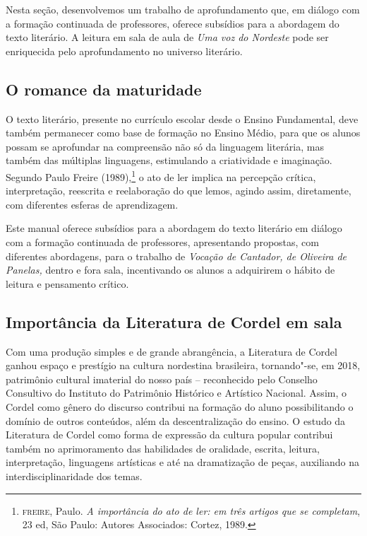\documentclass[12pt]{extarticle}
\begin{document}
Nesta seção, desenvolvemos um trabalho de aprofundamento que, em diálogo
com a formação continuada de professores, oferece subsídios para a
abordagem do texto literário. A leitura em sala de aula de
\emph{Uma voz do Nordeste} pode ser enriquecida pelo aprofundamento no
universo literário.

\subsection{O romance da maturidade}

O texto literário, presente no currículo escolar desde o Ensino
Fundamental, deve também permanecer como base de formação no Ensino
Médio, para que os alunos possam se aprofundar na compreensão não só da
linguagem literária, mas também das múltiplas linguagens, estimulando a
criatividade e imaginação. Segundo Paulo Freire (1989),\footnote{\textsc{freire}, Paulo. \textit{A importância do ato de ler: em três artigos que se completam}, 23 ed, São Paulo: Autores Associados: Cortez, 1989.} o ato de
ler implica na percepção crítica, interpretação, reescrita e
reelaboração do que lemos, agindo assim, diretamente, com diferentes
esferas de aprendizagem.

Este manual oferece subsídios para a abordagem do texto literário em
diálogo com a formação continuada de professores, apresentando
propostas, com diferentes abordagens, para o trabalho de \emph{Vocação
de Cantador, de Oliveira de Panelas,} dentro e fora sala, incentivando
os alunos a adquirirem o hábito de leitura e pensamento crítico.

\subsection{Importância da Literatura de Cordel em sala}

Com uma produção simples e de grande abrangência, a Literatura de Cordel
ganhou espaço e prestígio na cultura nordestina brasileira, tornando"-se,
em 2018, patrimônio cultural imaterial do nosso país -- reconhecido pelo
Conselho Consultivo do Instituto do Patrimônio Histórico e Artístico
Nacional. Assim, o Cordel como gênero do discurso contribui na formação
do aluno possibilitando o domínio de outros conteúdos, além da
descentralização do ensino. O estudo da Literatura de Cordel como forma
de expressão da cultura popular contribui também no aprimoramento das
habilidades de oralidade, escrita, leitura, interpretação, linguagens
artísticas e até na dramatização de peças, auxiliando na
interdisciplinaridade dos temas.
\end{document}
